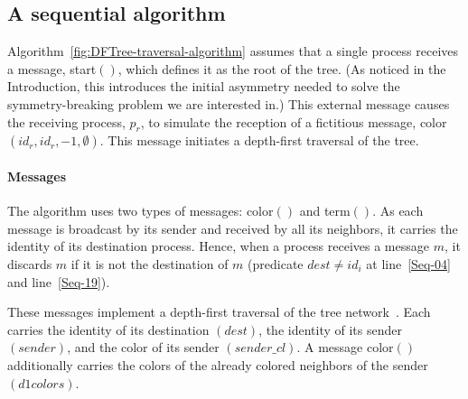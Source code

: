 \documentclass[11pt,english]{article}
\newcommand{\donecol}{\mathit{d1colors}}
\newcommand{\df}[1]{}\newcommand{\ccolor}{{\sc color}\xspace}
\begin{document}
\subsection{A  sequential algorithm}
Algorithm~\ref{fig:DFTree-traversal-algorithm} assumes that a single
process receives a message, {\sc start}$()$, which defines it as the
root of the tree. (As noticed in the Introduction, this introduces the
initial asymmetry\df{removed 'seed' from here too} needed to solve the
symmetry-breaking problem we are interested in.)  This external
message causes the receiving process, $p_r$, to simulate the reception
of a fictitious message, {\sc color}$(id_r,id_r,-1,\emptyset)$.  This
message initiates a depth-first traversal of the tree.


\paragraph{Messages}
The algorithm uses two types of messages: {\sc color}$()$ and {\sc
  term}$()$.  As each message is broadcast by its sender and received
by all its neighbors, it carries the identity of its destination
process.  Hence, when a process receives a message $m$, it discards
$m$ if it is not the destination of $m$ (predicate $dest \neq id_i$ at
line~\ref{Seq-04} and line~\ref{Seq-19}).

These messages implement a depth-first traversal of the tree
network~\cite{R13}. Each carries the identity of its destination
$(dest)$, the identity of its sender $(sender)$, and the color of its
sender $(sender\_cl)$. A message {\sc color}$()$ additionally carries
the colors of the already colored neighbors of the sender
$(\donecol)$.
\end{document}
